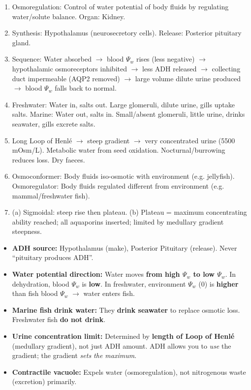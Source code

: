 \documentclass[11pt]{article}
\begin{document}
\begin{corrige}[Exercise 6]
\begin{enumerate}
    \item Osmoregulation: Control of water potential of body fluids by regulating water/solute balance. Organ: Kidney.
    \item Synthesis: Hypothalamus (neurosecretory cells). Release: Posterior pituitary gland.
    \item Sequence: Water absorbed $\rightarrow$ blood $\Psi_w$ rises (less negative) $\rightarrow$ hypothalamic osmoreceptors inhibited $\rightarrow$ less ADH released $\rightarrow$ collecting duct impermeable (AQP2 removed) $\rightarrow$ large volume dilute urine produced $\rightarrow$ blood $\Psi_w$ falls back to normal.
    \item Freshwater: Water in, salts out. Large glomeruli, dilute urine, gills uptake salts. Marine: Water out, salts in. Small/absent glomeruli, little urine, drinks seawater, gills excrete salts.
    \item Long Loop of Henlé $\rightarrow$ steep gradient $\rightarrow$ very concentrated urine (5500 mOsm/L). Metabolic water from seed oxidation. Nocturnal/burrowing reduces loss. Dry faeces.
    \item Osmoconformer: Body fluids iso-osmotic with environment (e.g. jellyfish). Osmoregulator: Body fluids regulated different from environment (e.g. mammal/freshwater fish).
    \item (a) Sigmoidal: steep rise then plateau. (b) Plateau = maximum concentrating ability reached; all aquaporins inserted; limited by medullary gradient steepness.
\end{enumerate}
\end{corrige}

\begin{attention}
\begin{itemize}
    \item \textbf{ADH source:} Hypothalamus (make), Posterior Pituitary (release). Never ``pituitary produces ADH''.
    \item \textbf{Water potential direction:} Water moves \textbf{from high $\Psi_w$ to low $\Psi_w$}. In dehydration, blood $\Psi_w$ is \textbf{low}. In freshwater, environment $\Psi_w$ (0) is \textbf{higher} than fish blood $\Psi_w$ $\rightarrow$ water enters fish.
    \item \textbf{Marine fish drink water:} They \textbf{drink seawater} to replace osmotic loss. Freshwater fish \textbf{do not drink}.
    \item \textbf{Urine concentration limit:} Determined by \textbf{length of Loop of Henlé} (medullary gradient), not just ADH amount. ADH allows you to \emph{use} the gradient; the gradient \emph{sets the maximum}.
    \item \textbf{Contractile vacuole:} Expels water (osmoregulation), not nitrogenous waste (excretion) primarily.
\end{itemize}
\end{attention}
\end{document}
